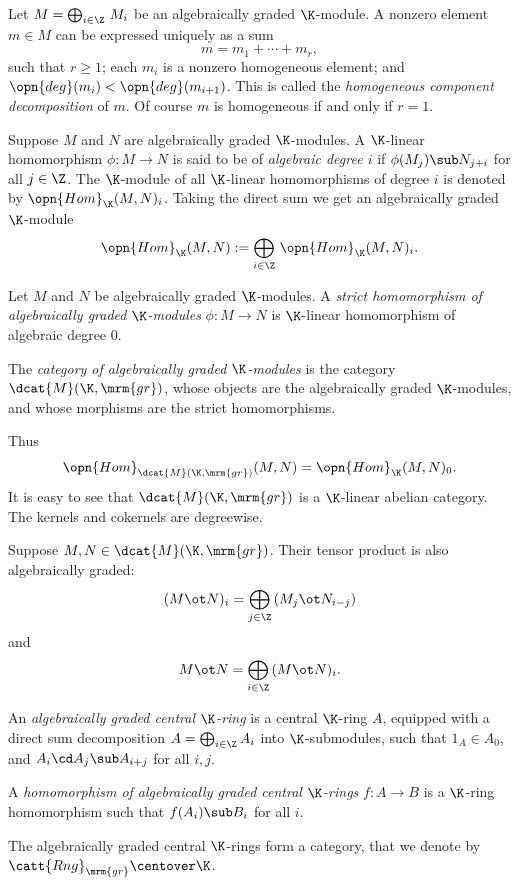 Let $M = \bigoplus_{i \in \Z} \, M_i$ be an algebraically graded $\K$-module.
A nonzero element $m \in M$ can be expressed uniquely as a sum 
\begin{equation} \label{eqn:4260}
m = m_{1} + \cdots + m_{r} , 
\end{equation}
such that $r \geq 1$; each $m_{i}$ is a nonzero homogeneous element; and 
$\opn{deg}(m_{i}) < \opn{deg}(m_{i + 1})$. 
This is called the {\em homogeneous component decomposition} of $m$. 
Of course $m$ is homogeneous if and only if $r = 1$. 

Suppose $M$ and $N$ are algebraically graded $\K$-modules. A $\K$-linear 
homomorphism $\phi : M \to N$
is said to be of {\em algebraic degree $i$} if
$\phi(M_j) \sub N_{j + i}$ for all $j \in \Z$. 
The $\K$-module of all $\K$-linear homomorphisms of degree $i$ is denoted by 
$\opn{Hom}_{\K}(M, N)_i$. Taking the direct sum we get an algebraically graded 
$\K$-module
\begin{equation}  \label{eqn:3701}
\opn{Hom}_{\K}(M, N) := \bigoplus_{i \in \Z} \, \opn{Hom}_{\K}(M, N)_i . 
\end{equation}

\begin{dfn}  \label{dfn:3700}
Let $M$ and $N$ be algebraically graded $\K$-modules. 
A {\em strict homomorphism of algebraically graded $\K$-modules}
$\phi : M \to N$ is $\K$-linear homomorphism of algebraic degree $0$.

The {\em category of algebraically graded $\K$-modules} is the category 
$\dcat{M}(\K, \mrm{gr})$, 
whose objects are the algebraically graded 
$\K$-modules, and whose morphisms are the strict homomorphisms.
\end{dfn}

Thus 
\[ \opn{Hom}_{\dcat{M}(\K, \mrm{gr})}(M, N) = \opn{Hom}_{\K}(M, N)_0 . \]
It is easy to see that $\dcat{M}(\K, \mrm{gr})$ is a $\K$-linear abelian 
category. The kernels and cokernels are degreewise. 

Suppose $M, N \in \dcat{M}(\K, \mrm{gr})$.
Their tensor product is also algebraically graded:
\[ (M \ot N)_i = \bigoplus_{j \in \Z} \, (M_j \ot N_{i - j}) \]
and 
\[ M \ot N = \bigoplus_{i \in \Z} \, (M \ot N)_i . \]

\begin{dfn}  \label{dfn:3701}
An {\em algebraically graded central $\K$-ring}
is a central $\K$-ring $A$, equipped with a direct sum decomposition 
$A = \bigoplus_{i \in \Z} A_i$ 
into $\K$-submodules, such that $1_A \in A_0$, and 
$A_i \cd A_j \sub A_{i + j}$ 
for all $i, j$.

A {\em homomorphism of algebraically graded central $\K$-rings}
$f : A \to B$ is a $\K$-ring homomorphism such that 
$f(A_i) \sub B_i$ for all $i$. 

The algebraically graded central $\K$-rings form a category, that we
denote by $\catt{Rng}_{\mrm{gr}} \centover \K$.
\end{dfn}

